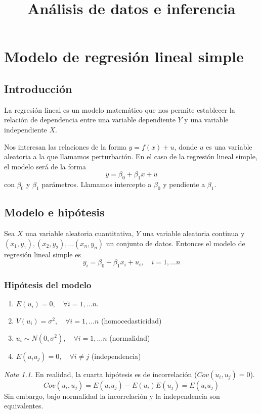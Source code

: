 \documentclass{report}
\title{Análisis de datos e inferencia}
\author{}
\theoremstyle{remark}
\theoremstyle{remark}
\newtheorem*{note}{Nota}
\theoremstyle{remark}
\theoremstyle{definition}
\theoremstyle{definition}
\theoremstyle{definition}
\begin{document}
\maketitle
\tableofcontents

\chapter{Modelo de regresión lineal simple}
\section{Introducción}

La regresión lineal es un modelo matemático que nos permite establecer la relación de dependencia entre una variable dependiente $Y$ y una variable independiente $X$.

Nos interesan las relaciones de la forma $y = f(x) + u$, donde $u$ es una variable aleatoria a la que llamamos perturbación.
En el caso de la regresión lineal simple, el modelo será de la forma $$y = \beta_0 + \beta_1x + u$$
con $\beta_0$ y $\beta_1$ parámetros.
Llamamos intercepto a $\beta_0$ y pendiente a $\beta_1$.

\section{Modelo e hipótesis}
Sea $X$ una variable aleatoria cuantitativa, $Y$ una variable aleatoria continua y $(x_1, y_1), (x_2, y_2), \dots (x_n, y_n)$ un conjunto de datos.
Entonces el modelo de regresión lineal simple es
$$y_i = \beta_0 + \beta_1x_i + u_i, \quad i = 1, \dots n$$

\subsection*{Hipótesis del modelo}
\begin{enumerate}
    \item $E(u_i) = 0, \quad \forall i = 1, \dots n$.
    \item $V(u_i) = \sigma^2, \quad \forall i = 1, \dots n$ (homocedasticidad)
    \item $u_i \sim N(0, \sigma^2), \quad \forall i = 1, \dots n$ (normalidad)
    \item $E(u_i u_j) = 0, \quad \forall i \neq j$ (independencia)
\end{enumerate}

\begin{note}
    En realidad, la cuarta hipótesis es de incorrelación ($Cov(u_i, u_j) = 0$).
    $$Cov(u_i, u_j) = E(u_i u_j) - E(u_i)E(u_j) = E(u_i u_j)$$
    Sin embargo, bajo normalidad la incorrelación y la independencia son equivalentes.
\end{note}
\end{document}
